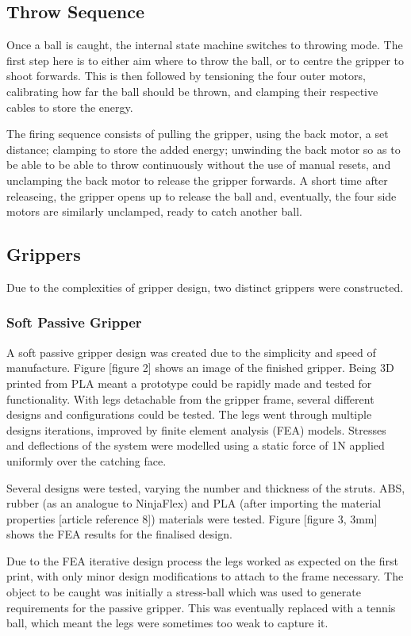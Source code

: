\documentclass[conference]{IEEEtran}
\begin{document}
\subsection{Throw Sequence}
Once a ball is caught, the internal state machine switches to throwing mode. The first step here is to either aim where to throw the ball, or to centre the gripper to shoot forwards. This is then followed by tensioning the four outer motors, calibrating how far the ball should be thrown, and clamping their respective cables to store the energy.

The firing sequence consists of pulling the gripper, using the back motor, a set distance; clamping to store the added energy; unwinding the back motor so as to be able to be able to throw continuously without the use of manual resets, and unclamping the back motor to release the gripper forwards. A short time after releaseing, the gripper opens up to release the ball and, eventually, the four side motors are similarly unclamped, ready to catch another ball.

	\subsection{Grippers}
	Due to the complexities of gripper design, two distinct grippers were constructed.
	\subsubsection{Soft Passive Gripper}
	A soft passive gripper design was created due to the simplicity and speed of manufacture. Figure [figure 2] shows an image of the finished gripper.
	Being 3D printed from PLA meant a prototype could be rapidly made and tested for functionality. With legs detachable from the gripper frame, several different designs and configurations could be tested. The legs went through multiple designs iterations, improved by finite element analysis (FEA) models. Stresses and deflections of the system were modelled using a static force of 1N applied uniformly over the catching face.
	
	Several designs were tested, varying the number and thickness of the struts. ABS, rubber (as an analogue to NinjaFlex) and PLA (after importing the material properties [article reference 8]) materials were tested. Figure [figure 3, 3mm] shows the FEA results for the finalised design.
	
	Due to the FEA iterative design process the legs worked as expected on the first print, with only minor design modifications to attach to the frame necessary. The object to be caught was initially a stress-ball which was used to generate requirements for the passive gripper. This was eventually replaced with a tennis ball, which meant the legs were sometimes too weak to capture it. 
\end{document}
